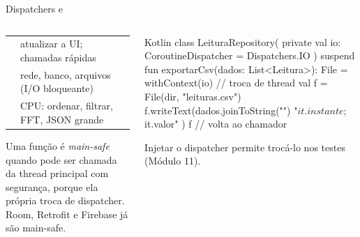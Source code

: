 \documentclass[aspectratio=169,10pt]{beamer}
\begin{document}
\begin{frame}[fragile]{Dispatchers e }
  \begin{columns}[T]
    \begin{column}{0.5\textwidth}
      \footnotesize
      \begin{tabularx}{\linewidth}{@{}l L@{}}
        \toprule
         &  \\
        \midrule
         & atualizar a UI; chamadas rápidas \\
         & rede, banco, arquivos (I/O bloqueante) \\
         & CPU: ordenar, filtrar, FFT, JSON grande \\
        \bottomrule
      \end{tabularx}
      \vspace{3pt}
      \begin{conceito}
        Uma função é \emph{main-safe} quando pode ser chamada da thread principal com segurança, porque ela própria troca de dispatcher. Room, Retrofit e Firebase já são main-safe.
      \end{conceito}
    \end{column}
    \begin{column}{0.48\textwidth}
\begin{codigo}[title=Repositório main-safe]{Kotlin}
class LeituraRepository(
  private val io: CoroutineDispatcher = Dispatchers.IO
) {
  suspend fun exportarCsv(dados: List<Leitura>): File =
    withContext(io) {               // troca de thread
      val f = File(dir, "leituras.csv")
      f.writeText(dados.joinToString("\n") {
        "${it.instante};${it.valor}"
      })
      f
    }                               // volta ao chamador
}
\end{codigo}
      \begin{dica}
        Injetar o dispatcher permite trocá-lo nos testes (Módulo 11).
      \end{dica}
    \end{column}
  \end{columns}
\end{frame}
\end{document}
